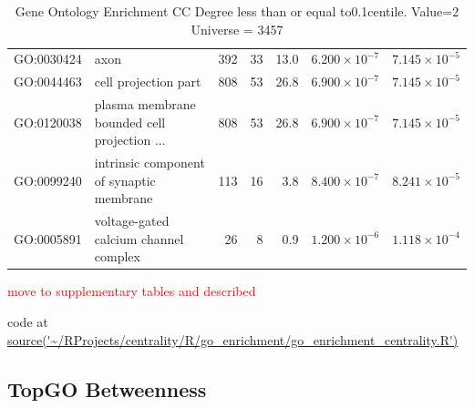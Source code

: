 \begin{table}[ht]
\begin{adjustbox}{max width=\textwidth}
\begin{tabular}{llrrrrr}
  GO:0030424 & axon & 392 & 33 & 13.0 & $6.200 \times 10^{-7}$ & $7.145 \times 10^{-5}$ \\ 
  GO:0044463 & cell projection part & 808 & 53 & 26.8 & $6.900 \times 10^{-7}$ & $7.145 \times 10^{-5}$ \\ 
  GO:0120038 & plasma membrane bounded cell projection ... & 808 & 53 & 26.8 & $6.900 \times 10^{-7}$ & $7.145 \times 10^{-5}$ \\ 
  GO:0099240 & intrinsic component of synaptic membrane & 113 & 16 & 3.8 & $8.400 \times 10^{-7}$ & $8.241 \times 10^{-5}$ \\ 
  GO:0005891 & voltage-gated calcium channel complex & 26 & 8 & 0.9 & $1.200 \times 10^{-6}$ & $1.118 \times 10^{-4}$ \\ 
   \hline
\end{tabular}
\end{adjustbox}
\caption{Gene Ontology Enrichment CC Degree  less than or equal to0.1centile.   Value=2 Universe = 3457} 
\label{tab:Gene Ontology Enrichment CC Degree  less than or equal to0.1centile.   Value=2 Universe = 3457}
\end{table}
\textcolor{red}{move to supplementary tables and described}


code at \url{source('~/RProjects/centrality/R/go_enrichment/go_enrichment_centrality.R')}

\subsection{TopGO Betweenness}

